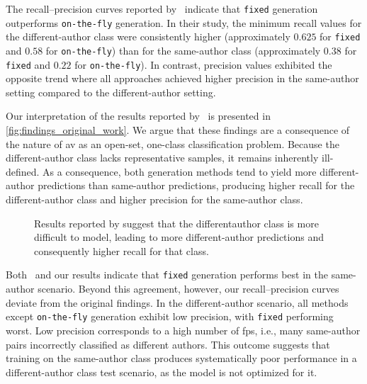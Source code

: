 The recall–precision curves reported by \citet{koppel_determining_2014}\ indicate that \texttt{fixed} \imp{} generation outperforms \texttt{on-the-fly} \imp{} generation.
In their study, the minimum recall values for the different-author class were consistently higher (approximately $0.625$ for \texttt{fixed} and $0.58$ for \texttt{on-the-fly}) than for the same-author class (approximately $0.38$ for \texttt{fixed} and $0.22$ for \texttt{on-the-fly}).
In contrast, precision values exhibited the opposite trend where all approaches achieved higher precision in the same-author setting compared to the different-author setting.

Our interpretation of the results reported by \citet{koppel_determining_2014}\ is presented in \autoref{fig:findings_original_work}.
We argue that these findings are a consequence of the nature of \ac{av} as an open-set, one-class classification problem.
Because the different-author class lacks representative samples, it remains inherently ill-defined.
As a consequence, both \imp{} generation methods tend to yield more different-author predictions than same-author predictions, producing higher recall for the different-author class and higher precision for the same-author class.

\begin{figure}[htbp]
    \centering
    
    \caption[Aggregating original \impAppr{} experiment results.]{Results reported by \citet{koppel_determining_2014} suggest that the different\-author class is more difficult to model, leading to more different-author predictions and consequently higher recall for that class.}
    \label{fig:findings_original_work}
\end{figure}

Both \citet{koppel_determining_2014}\ and our results indicate that \texttt{fixed} \imp{} generation performs best in the same-author scenario.
Beyond this agreement, however, our recall–precision curves deviate from the original findings.
In the different-author scenario, all methods except \texttt{on-the-fly} generation exhibit low precision, with \texttt{fixed} \imps{} performing worst.
Low precision corresponds to a high number of \acp{fp}, i.e., many same-author pairs incorrectly classified as different authors.
This outcome suggests that training on the same-author class produces systematically poor performance in a different-author class test scenario, as the model is not optimized for it.

